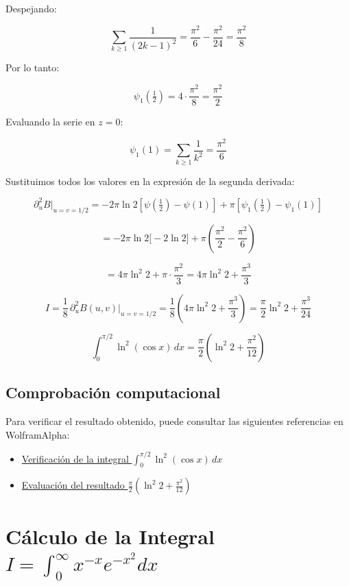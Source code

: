\documentclass[a4paper]{article}
\begin{document}
Despejando:

$$\sum_{k\geq 1}\frac{1}{(2k-1)^2} = \frac{\pi^2}{6} - \frac{\pi^2}{24} = \frac{\pi^2}{8}$$

Por lo tanto:

$$\psi_1\!\left(\tfrac{1}{2}\right) = 4\cdot\frac{\pi^2}{8} = \frac{\pi^2}{2}$$


Evaluando la serie en $z = 0$:

$$\psi_1(1) = \sum_{k\geq 1}\frac{1}{k^2} = \frac{\pi^2}{6}$$


Sustituimos todos los valores en la expresión de la segunda derivada:

$$\partial_u^2 B\Big|_{u=v=1/2} = -2\pi\ln 2\left[\psi\!\left(\tfrac{1}{2}\right) - \psi(1)\right] + \pi\left[\psi_1\!\left(\tfrac{1}{2}\right) - \psi_1(1)\right]$$

$$= -2\pi\ln 2\big[-2\ln 2\big] + \pi\left(\frac{\pi^2}{2} - \frac{\pi^2}{6}\right)$$

$$= 4\pi\ln^2 2 + \pi\cdot\frac{\pi^2}{3} = 4\pi\ln^2 2 + \frac{\pi^3}{3}$$


$$I = \frac{1}{8}\,\partial_u^2 B(u,v)\Big|_{u=v=1/2} = \frac{1}{8}\left(4\pi\ln^2 2 + \frac{\pi^3}{3}\right) = \frac{\pi}{2}\ln^2 2 + \frac{\pi^3}{24}$$

$$\boxed{\int_0^{\pi/2} \ln^2(\cos x)\, dx = \frac{\pi}{2}\left(\ln^2 2 + \frac{\pi^2}{12}\right)}$$

\subsection{Comprobación computacional}

Para verificar el resultado obtenido, puede consultar las siguientes referencias en WolframAlpha:

\begin{itemize}
    \item \href{https://www.wolframalpha.com/input?i=Integrate%5BLog%5BCos%5Bx%5D%5D%5E2%2C%7Bx%2C0%2CPi%2F2%7D%5D}{Verificación de la integral $\displaystyle\int_0^{\pi/2} \ln^2(\cos x)\, dx$}
    
    \item \href{https://www.wolframalpha.com/input?i=Pi%2F2*%28Log%5B2%5D%5E2%2B%5Cpi%5E2%2F12%29}{Evaluación del resultado $\displaystyle\frac{\pi}{2}\left(\ln^2 2 + \frac{\pi^2}{12}\right)$}
\end{itemize}

\section{Cálculo de la Integral $I = \int_{0}^{\infty} x^{-x} e^{-x^2} dx$}
\end{document}
